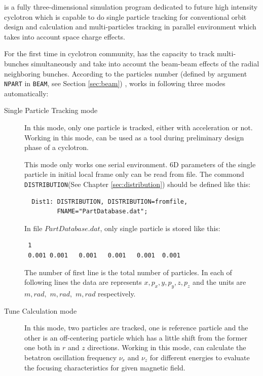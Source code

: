 \opalcycl is a fully three-dimensional simulation program dedicated to future high intensity cyclotron 
which is capable to do single particle tracking for conventional orbit design and calculation and 
multi-particles tracking in parallel environment which takes into account space charge effects.
 
For the first time in cyclotron community, \opalcycl has the capacity to track multi-bunches simultaneously
and take into account the beam-beam effects of the radial neighboring bunches.
According to the particles number (defined by argument \texttt{NPART} in \texttt{BEAM}, see Section \ref{sec:beam}) , 
\opalcycl works in following three modes automatically:

\begin{description}

\item[Single Particle Tracking mode]

  In this mode, only one particle is tracked, either with acceleration or not.  Working in this mode, \opalcycl
  can be used as a tool during preliminary design phase of a cyclotron.  

  This mode only works one serial environment. 6D parameters of the single particle in initial local frame only can be read
  from file. The commond \texttt{DISTRIBUTION}(See Chapter \ref{sec:distribution}) should be defined like this:
\begin{verbatim}
  Dist1: DISTRIBUTION, DISTRIBUTION=fromfile,
         FNAME="PartDatabase.dat";
\end{verbatim}
 In file $PartDatabase.dat$, only single particle is stored like this:
\begin{verbatim}
 1
 0.001 0.001   0.001   0.001   0.001  0.001    
\end{verbatim}

The number of first line is the total number of particles.
In each of following lines the data are represents $x, p_x, y,$$ p_y, z, p_z$ and the units are $m, rad,$ $ m,rad,$ $ m, rad$ respectively.

\item[Tune Calculation mode]

  In this mode, two particles are tracked, one is reference particle and the other is an off-centering particle 
  which has a little shift from the former one both in $r$ and $z$ directions. Working in this mode, \opalcycl can 
  calculate the betatron oscillation frequency $\nu_r$ and $\nu_z$ for different energies to evaluate the focusing characteristics 
  for given magnetic field.


\end{description}
